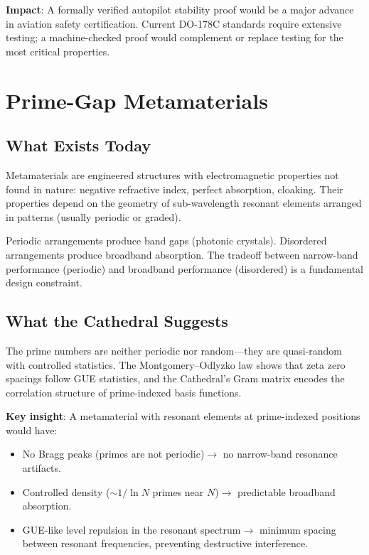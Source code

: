 \documentclass[11pt,a4paper]{article}
\begin{document}
\textbf{Impact}: A formally verified autopilot stability proof would
be a major advance in aviation safety certification. Current DO-178C
standards require extensive testing; a machine-checked proof would
complement or replace testing for the most critical properties.

\section{Prime-Gap Metamaterials}
\label{sec:metamaterials}

\subsection{What Exists Today}

Metamaterials are engineered structures with electromagnetic
properties not found in nature: negative refractive index, perfect
absorption, cloaking. Their properties depend on the geometry of
sub-wavelength resonant elements arranged in patterns (usually
periodic or graded).

Periodic arrangements produce band gaps (photonic crystals).
Disordered arrangements produce broadband absorption. The tradeoff
between narrow-band performance (periodic) and broadband performance
(disordered) is a fundamental design constraint.

\subsection{What the Cathedral Suggests}

The prime numbers are neither periodic nor random---they are
quasi-random with controlled statistics. The Montgomery--Odlyzko
law shows that zeta zero spacings follow GUE statistics, and the
Cathedral's Gram matrix encodes the correlation structure of
prime-indexed basis functions.

\textbf{Key insight}: A metamaterial with resonant elements at
prime-indexed positions would have:
\begin{itemize}
  \item No Bragg peaks (primes are not periodic)$\to$ no
    narrow-band resonance artifacts.
  \item Controlled density ($\sim 1/\ln N$ primes near $N$)$\to$
    predictable broadband absorption.
  \item GUE-like level repulsion in the resonant spectrum$\to$
    minimum spacing between resonant frequencies, preventing
    destructive interference.
\end{itemize}
\end{document}
